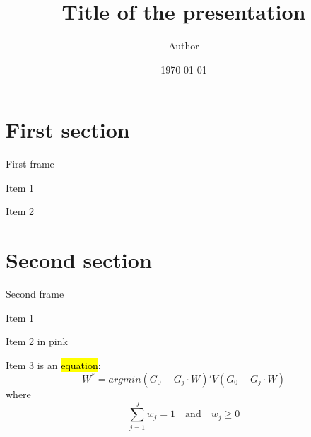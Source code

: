 \documentclass[11pt, hyperref = {unicode}, aspectratio=169]{beamer}
\title[Title]{\firamedium\LARGE Title of the presentation}
\author[Author]{\firamedium Author}
\date{\small \today}
\makeatletter
\newenvironment{wideitemize}{\itemize\addtolength{\itemsep}{0.6ex}}{\enditemize} %
\let\HL\hl
\renewcommand\hl{%
	\let\set@color\beamerorig@set@color
	\let\reset@color\beamerorig@reset@color
	\HL}
\newcommand{\hlight}[1]{{\sethlcolor{Color3}\hl{#1}}}
\makeatother
\begin{document}
	\begin{frame}
		\titlepage
	\end{frame}
	
	\section{First section}
	
	\begin{frame}{First frame}
		\begin{wideitemize}
			\item Item 1
			\item Item 2
		\end{wideitemize}
	\end{frame}
	
	\section{Second section}
	\begin{frame}{Second frame}
		\begin{wideitemize}
			\item<1-> Item 1
			\item<2-> Item 2 in \textcolor{Color4}{pink}
			\item<3-> Item 3 is an \hlight{equation}:
			\[W^* = argmin (G_0 - G_j\cdot W)'V(G_0 - G_j\cdot W)
			\]
			where \[\sum\limits_{j=1}^J w_j = 1 \quad \text{and} \quad w_j \geq 0\]
		\end{wideitemize}
	\end{frame}
	
	
\end{document}
